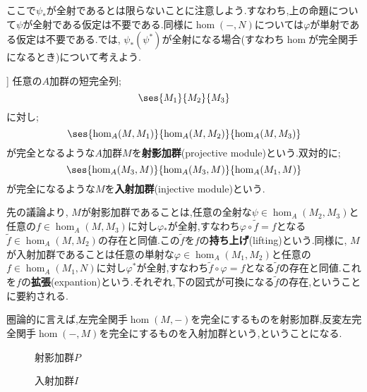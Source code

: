 ここで$\psi_\ast $が全射であるとは限らないことに注意しよう.すなわち,上の命題について$\psi$が全射である仮定は不要である.同様に$\hom(-,N)$については$\varphi$が単射である仮定は不要である.では, $\psi_\ast(\psi^\ast)$が全射になる場合(すなわち$\hom$が完全関手になるとき)について考えよう.
\begin{defi}
	]
	任意の$A$加群の短完全列;
	\[\ses{M_1}{M_2}{M_3}\]
	に対し;
	\[\ses{\hom_A(M,M_1)}{\hom_A(M,M_2)}{\hom_A(M,M_3)}\]
	が完全となるような$A$加群$M$を\textbf{射影加群}(projective module)という.双対的に;
	\[\ses{\hom_A(M_3,M)}{\hom_A(M_3,M)}{\hom_A(M_1,M)}\]
	が完全になるような$M$を\textbf{入射加群}(injective module)という.
\end{defi}

先の議論より, $M$が射影加群であることは,任意の全射な$\psi\in\hom_A(M_2,M_3)$と任意の$f\in\hom_A(M,M_3)$に対し$\varphi{}_\ast $が全射,すなわち$\varphi\circ\widetilde{f}=f$となる$\widetilde{f}\in\hom_A(M,M_2)$の存在と同値.この$\widetilde{f}$を$f$の\textbf{持ち上げ}(lifting)という.同様に, $M$が入射加群であることは任意の単射な$\varphi\in\hom_A(M_1,M_2)$と任意の$f\in\hom_A(M_1,N)$に対し$\varphi^\ast $が全射,すなわち$\widetilde{f}\circ\varphi=f$となる$\widetilde{f}$の存在と同値.これを$f$の\textbf{拡張}(expantion)という.それぞれ,下の図式が可換になる$\widetilde{f}$の存在,ということに要約される.

圏論的に言えば,左完全関手$\hom(M,-)$を完全にするものを射影加群,反変左完全関手$\hom(-,M)$を完全にするものを入射加群という,ということになる.

\begin{minipage}{.45\hsize}
	\begin{figure}[H]
		\centering
		\caption{射影加群$P$}
	\end{figure}
\end{minipage}
\hfill
\begin{minipage}{.45\hsize}
	\begin{figure}[H]
		\centering
		\caption{入射加群$I$}
	\end{figure}
\end{minipage}


